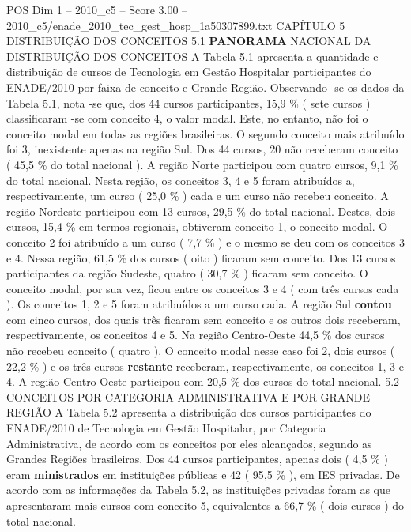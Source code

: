 \begin{textsample}{POS Dim 1 – 2010\_c5 – Score 3.00 – 2010\_c5/enade\_2010\_tec\_gest\_hosp\_1a50307899.txt}  \label{ex:f1_pos_140}
CAPÍTULO 5 DISTRIBUIÇÃO DOS CONCEITOS 5.1 \textbf{PANORAMA} NACIONAL DA DISTRIBUIÇÃO DOS CONCEITOS A Tabela 5.1 apresenta a quantidade e distribuição de cursos de Tecnologia em Gestão Hospitalar participantes do ENADE/2010 por faixa de conceito e Grande Região.
Observando -se os dados da Tabela 5.1, nota -se que, dos 44 cursos participantes, 15,9 \% ( sete cursos ) classificaram -se com conceito 4, o valor modal.
Este, no entanto, não foi o conceito modal em todas as regiões brasileiras.
O segundo conceito mais atribuído foi 3, inexistente apenas na região Sul.
Dos 44 cursos, 20 não receberam conceito ( 45,5 \% do total nacional ).
A região Norte participou com quatro cursos, 9,1 \% do total nacional.
Nesta região, os conceitos 3, 4 e 5 foram atribuídos a, respectivamente, um curso ( 25,0 \% ) cada e um curso não recebeu conceito.
A região Nordeste participou com 13 cursos, 29,5 \% do total nacional.
Destes, dois cursos, 15,4 \% em termos regionais, obtiveram conceito 1, o conceito modal.
O conceito 2 foi atribuído a um curso ( 7,7 \% ) e o mesmo se deu com os conceitos 3 e 4.
Nessa região, 61,5 \% dos cursos ( oito ) ficaram sem conceito.
Dos 13 cursos participantes da região Sudeste, quatro ( 30,7 \% ) ficaram sem conceito.
O conceito modal, por sua vez, ficou entre os conceitos 3 e 4 ( com três cursos cada ).
Os conceitos 1, 2 e 5 foram atribuídos a um curso cada.
A região Sul \textbf{contou} com cinco cursos, dos quais três ficaram sem conceito e os outros dois receberam, respectivamente, os conceitos 4 e 5.
Na região Centro-Oeste 44,5 \% dos cursos não recebeu conceito ( quatro ).
O conceito modal nesse caso foi 2, dois cursos ( 22,2 \% ) e os três cursos \textbf{restante} receberam, respectivamente, os conceitos 1, 3 e 4.
A região Centro-Oeste participou com 20,5 \% dos cursos do total nacional. 5.2 CONCEITOS POR CATEGORIA ADMINISTRATIVA E POR GRANDE REGIÃO A Tabela 5.2 apresenta a distribuição dos cursos participantes do ENADE/2010 de Tecnologia em Gestão Hospitalar, por Categoria Administrativa, de acordo com os conceitos por eles alcançados, segundo as Grandes Regiões brasileiras.
Dos 44 cursos participantes, apenas dois ( 4,5 \% ) eram \textbf{ministrados} em instituições públicas e 42 ( 95,5 \% ), em IES privadas.
De acordo com as informações da Tabela 5.2, as instituições privadas foram as que apresentaram mais cursos com conceito 5, equivalentes a 66,7 \% ( dois cursos ) do total nacional.

\end{textsample}
